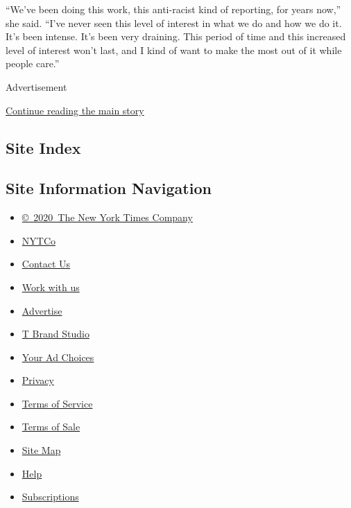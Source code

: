 ``We've been doing this work, this anti-racist kind of reporting, for
years now,'' she said. ``I've never seen this level of interest in what
we do and how we do it. It's been intense. It's been very draining. This
period of time and this increased level of interest won't last, and I
kind of want to make the most out of it while people care.''

Advertisement

\protect\hyperlink{after-bottom}{Continue reading the main story}

\hypertarget{site-index}{%
\subsection{Site Index}\label{site-index}}

\hypertarget{site-information-navigation}{%
\subsection{Site Information
Navigation}\label{site-information-navigation}}

\begin{itemize}
\tightlist
\item
  \href{https://help.nytimes3xbfgragh.onion/hc/en-us/articles/115014792127-Copyright-notice}{©~2020~The
  New York Times Company}
\end{itemize}

\begin{itemize}
\tightlist
\item
  \href{https://www.nytco.com/}{NYTCo}
\item
  \href{https://help.nytimes3xbfgragh.onion/hc/en-us/articles/115015385887-Contact-Us}{Contact
  Us}
\item
  \href{https://www.nytco.com/careers/}{Work with us}
\item
  \href{https://nytmediakit.com/}{Advertise}
\item
  \href{http://www.tbrandstudio.com/}{T Brand Studio}
\item
  \href{https://www.nytimes3xbfgragh.onion/privacy/cookie-policy\#how-do-i-manage-trackers}{Your
  Ad Choices}
\item
  \href{https://www.nytimes3xbfgragh.onion/privacy}{Privacy}
\item
  \href{https://help.nytimes3xbfgragh.onion/hc/en-us/articles/115014893428-Terms-of-service}{Terms
  of Service}
\item
  \href{https://help.nytimes3xbfgragh.onion/hc/en-us/articles/115014893968-Terms-of-sale}{Terms
  of Sale}
\item
  \href{https://spiderbites.nytimes3xbfgragh.onion}{Site Map}
\item
  \href{https://help.nytimes3xbfgragh.onion/hc/en-us}{Help}
\item
  \href{https://www.nytimes3xbfgragh.onion/subscription?campaignId=37WXW}{Subscriptions}
\end{itemize}
